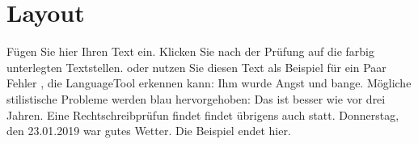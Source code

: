 
\section{Layout}

Fügen Sie hier Ihren Text ein. Klicken Sie nach der Prüfung auf die farbig unterlegten Textstellen. oder nutzen Sie diesen Text als Beispiel für ein Paar Fehler , die LanguageTool erkennen kann: Ihm wurde Angst und bange. Mögliche stilistische Probleme werden blau hervorgehoben: Das ist besser wie vor drei Jahren. Eine Rechtschreibprüfun findet findet übrigens auch statt. Donnerstag, den 23.01.2019 war gutes Wetter. Die Beispiel endet hier.
